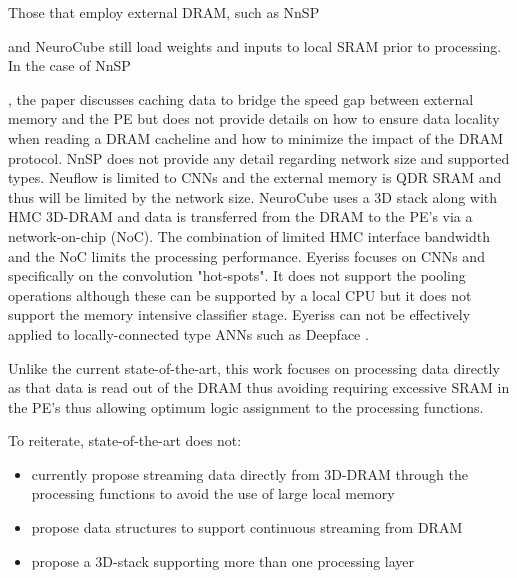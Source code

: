 Those that employ external DRAM, such as NnSP{\cite{esmaeilzadeh2005nnsp} and NeuroCube\cite{kim2016neurocube} still 
load weights and inputs to local SRAM prior to processing.
In the case of NnSP{\cite{esmaeilzadeh2005nnsp}, the paper discusses caching data to bridge the speed gap between external memory and the PE 
but does not provide details on how to ensure data locality when reading a DRAM cacheline and how to minimize the impact of the DRAM protocol.
NnSP does not provide any detail regarding network size and supported types.
Neuflow\cite{farabet2011neuflow} is limited to CNNs and the external memory is QDR SRAM 
and thus will be limited by the network size.
NeuroCube uses a 3D stack along with HMC 3D-DRAM and data is transferred from the DRAM to the PE's via a network-on-chip (NoC).
The combination of limited HMC interface bandwidth and the NoC limits the processing performance.
Eyeriss\cite{chen201614} focuses on CNNs and specifically on the convolution "hot-spots". It does not support the pooling operations although these can
be supported by a local CPU but it does not support the memory intensive classifier stage. 
Eyeriss can not be effectively applied to locally-connected type ANNs such as Deepface \cite{Taigman_2014_CVPR}.

\iftrue
Unlike the current state-of-the-art, this work focuses on processing data directly as that data is read out of the DRAM thus avoiding requiring excessive SRAM
in the PE's thus allowing optimum logic assignment to the processing functions.

To reiterate, state-of-the-art does not:
\vspace{-3mm}
\begin{itemize}
  \itemsep-1.5mm
  \item currently propose streaming data directly from 3D-DRAM through the processing functions to avoid the use of large local memory
  \item propose data structures to support continuous streaming from DRAM
  \item propose a 3D-stack supporting more than one processing layer
\end{itemize}

}}
